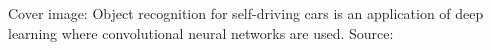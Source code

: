 \documentclass{article}
\begin{document}


\newpage
Cover image: Object recognition for self-driving cars is an application of deep learning where convolutional neural networks are used. Source: \cite{effps}


\vspace{1cm}
\tableofcontents
\vspace{1cm}


















\end{document}

